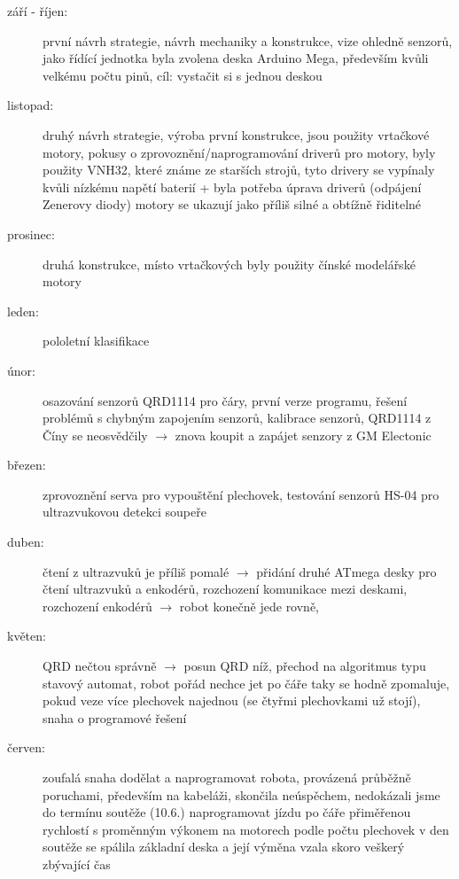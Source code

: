 \begin{description}
	\item[září - říjen:]  první návrh strategie, návrh mechaniky a konstrukce, vize ohledně senzorů, 
	jako řídící jednotka byla zvolena deska Arduino Mega, především kvůli velkému počtu pinů, cíl: vystačit si s jednou deskou  
	
	\item[listopad:]  druhý návrh strategie, výroba první konstrukce, jsou použity vrtačkové motory, 
	pokusy o zprovoznění/naprogramování driverů pro motory, byly použity VNH32, které známe ze starších strojů, 
	tyto drivery se vypínaly kvůli nízkému napětí baterií + byla potřeba úprava driverů (odpájení Zenerovy diody)  
	motory se ukazují jako příliš silné a obtížně řiditelné 
	
	\item[prosinec:] druhá konstrukce, místo vrtačkových byly použity čínské modelářské motory
	
	\item[leden:]  pololetní klasifikace 
	
	\item[únor:]  osazování senzorů QRD1114 pro čáry, první verze programu, 
	řešení problémů s chybným zapojením senzorů, 
	kalibrace senzorů, QRD1114 z Číny se neosvědčily $\rightarrow$ znova koupit a zapájet senzory z GM Electonic
	

	\item[březen:]  zprovoznění serva pro vypouštění plechovek, 
	testování senzorů HS-04 pro ultrazvukovou detekci soupeře 
	
	\item[duben:] čtení z ultrazvuků je příliš pomalé $\rightarrow$
	přidání druhé ATmega desky pro čtení ultrazvuků a enkodérů, 
	rozchození komunikace mezi deskami,
	rozchození enkodérů $\rightarrow$ robot konečně jede rovně,
	
	\item[květen:] QRD nečtou správně $\rightarrow$ posun QRD níž, přechod na algoritmus typu stavový automat, robot pořád nechce jet po čáře  
	taky se hodně zpomaluje, pokud veze více plechovek najednou (se čtyřmi plechovkami už stojí), snaha o programové řešení 
	
	\item[červen:] zoufalá snaha dodělat a naprogramovat robota, provázená průběžně poruchami,
	především na kabeláži, skončila neúspěchem, nedokázali jsme do termínu soutěže (10.6.) naprogramovat jízdu po čáře přiměřenou rychlostí
	s proměnným výkonem na motorech podle počtu plechovek 
	v den soutěže se spálila základní deska a její výměna vzala skoro veškerý zbývající čas 	
	
\end{description}




